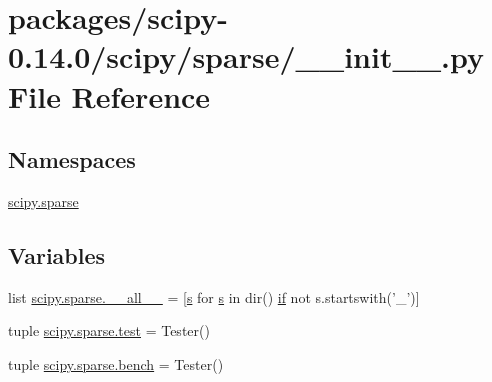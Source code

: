 \hypertarget{packages_2scipy-0_814_80_2scipy_2sparse_2____init_____8py}{}\section{packages/scipy-\/0.14.0/scipy/sparse/\+\_\+\+\_\+init\+\_\+\+\_\+.py File Reference}
\label{packages_2scipy-0_814_80_2scipy_2sparse_2____init_____8py}
\subsection*{Namespaces}
\begin{DoxyCompactItemize}
\item 
 \hyperlink{namespacescipy_1_1sparse}{scipy.\+sparse}
\end{DoxyCompactItemize}
\subsection*{Variables}
\begin{DoxyCompactItemize}
\item 
list \hyperlink{namespacescipy_1_1sparse_a012f619dd03343fa320a2b36b9710de3}{scipy.\+sparse.\+\_\+\+\_\+all\+\_\+\+\_\+} = \mbox{[}\hyperlink{indexexpr_8h_ae024b0db549122b44c349ae28ec990dc}{s} for \hyperlink{indexexpr_8h_ae024b0db549122b44c349ae28ec990dc}{s} in dir() \hyperlink{minmax_8h_a30a0ee9fee303f01d9c5e6f669e0dfe9}{if} not s.\+startswith('\+\_\+')\mbox{]}
\item 
tuple \hyperlink{namespacescipy_1_1sparse_a02160871edc624a6129587f1dbe86093}{scipy.\+sparse.\+test} = Tester()
\item 
tuple \hyperlink{namespacescipy_1_1sparse_a5e85f04fbdf989231a00354a0ef449a8}{scipy.\+sparse.\+bench} = Tester()
\end{DoxyCompactItemize}
